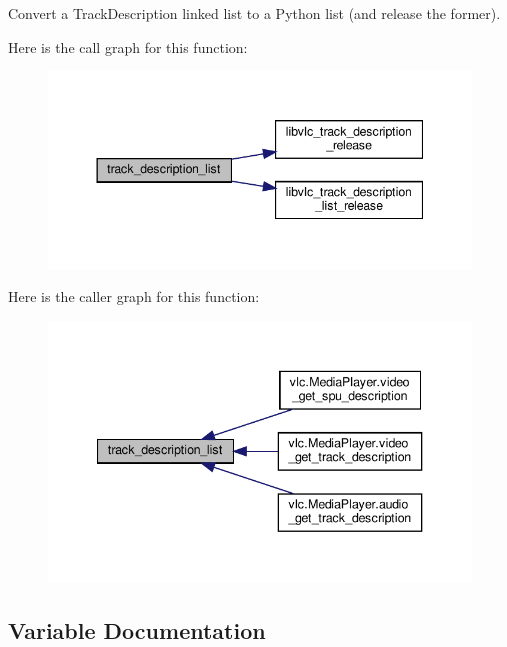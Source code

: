 \begin{DoxyVerb}Convert a TrackDescription linked list to a Python list (and release the former).
\end{DoxyVerb}
 Here is the call graph for this function\+:
\nopagebreak
\begin{figure}[H]
\begin{center}
\leavevmode
\includegraphics[width=344pt]{namespacevlc_a7641c1329f78164fb94c4a89738ff38a_cgraph}
\end{center}
\end{figure}
Here is the caller graph for this function\+:
\nopagebreak
\begin{figure}[H]
\begin{center}
\leavevmode
\includegraphics[width=340pt]{namespacevlc_a7641c1329f78164fb94c4a89738ff38a_icgraph}
\end{center}
\end{figure}


\subsection{Variable Documentation}
\mbox{\label{namespacevlc_a4ad1eb96239eecf8f075ae4c92adab5e}} 
